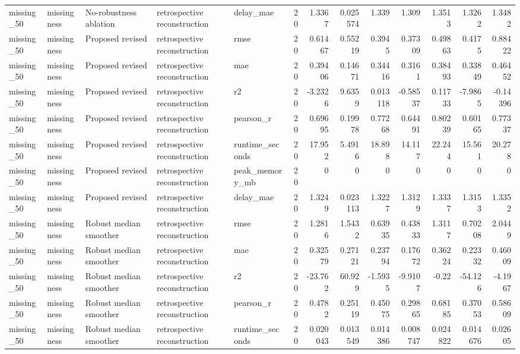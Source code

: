 \begin{table}[!htbp]
{{\begin{tabular}{lllllrrrrrrrr}
missing_50 & missingness & No-robustness ablation & retrospective reconstruction & delay_mae & 20 & 1.3367 & 0.025574 & 1.339 & 1.309 & 1.3513 & 1.3262 & 1.3482 \\
missing_50 & missingness & Proposed revised & retrospective reconstruction & rmse & 20 & 0.61467 & 0.55219 & 0.3945 & 0.37309 & 0.49863 & 0.4175 & 0.88422 \\
missing_50 & missingness & Proposed revised & retrospective reconstruction & mae & 20 & 0.39406 & 0.14671 & 0.34416 & 0.3161 & 0.38493 & 0.33849 & 0.46452 \\
missing_50 & missingness & Proposed revised & retrospective reconstruction & r2 & 20 & -3.2326 & 9.6359 & 0.013118 & -0.58537 & 0.11733 & -7.9865 & -0.14396 \\
missing_50 & missingness & Proposed revised & retrospective reconstruction & pearson_r & 20 & 0.69695 & 0.19978 & 0.77268 & 0.64491 & 0.80239 & 0.60165 & 0.77337 \\
missing_50 & missingness & Proposed revised & retrospective reconstruction & runtime_seconds & 20 & 17.952 & 5.4916 & 18.898 & 14.117 & 22.244 & 15.561 & 20.278 \\
missing_50 & missingness & Proposed revised & retrospective reconstruction & peak_memory_mb & 20 & 0 & 0 & 0 & 0 & 0 & 0 & 0 \\
missing_50 & missingness & Proposed revised & retrospective reconstruction & delay_mae & 20 & 1.3249 & 0.023113 & 1.3227 & 1.3129 & 1.3337 & 1.3153 & 1.3352 \\
missing_50 & missingness & Robust median smoother & retrospective reconstruction & rmse & 20 & 1.2816 & 1.5432 & 0.63935 & 0.43833 & 1.3117 & 0.70208 & 2.0449 \\
missing_50 & missingness & Robust median smoother & retrospective reconstruction & mae & 20 & 0.32579 & 0.27121 & 0.23794 & 0.17672 & 0.36224 & 0.22332 & 0.46009 \\
missing_50 & missingness & Robust median smoother & retrospective reconstruction & r2 & 20 & -23.762 & 60.929 & -1.5935 & -9.9107 & -0.22 & -54.126 & -4.1967 \\
missing_50 & missingness & Robust median smoother & retrospective reconstruction & pearson_r & 20 & 0.4782 & 0.25119 & 0.45075 & 0.29865 & 0.68185 & 0.37053 & 0.58609 \\
missing_50 & missingness & Robust median smoother & retrospective reconstruction & runtime_seconds & 20 & 0.020043 & 0.013549 & 0.014386 & 0.008747 & 0.024822 & 0.014676 & 0.02605 \\

\end{tabular}}}
\end{table}
